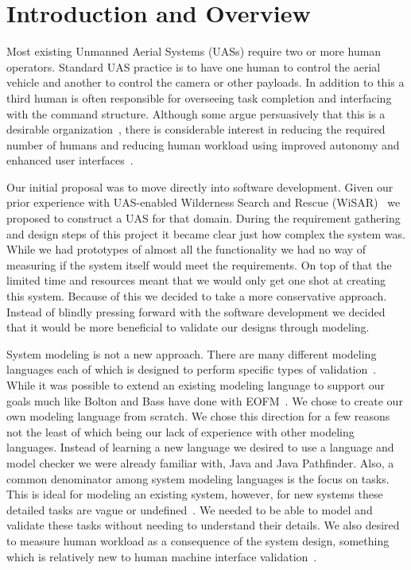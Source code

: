 \chapter{Introduction and Overview}
Most existing Unmanned Aerial Systems (UASs) require two or more human operators\cite{GoodrichMorse2008,MurphyStoverPrattGriffin2006}. Standard UAS practice is to have one human to control the aerial vehicle and another to control the camera or other payloads. In addition to this a third human is often responsible for overseeing task completion and interfacing with the command structure. Although some argue persuasively that this is a desirable organization~\cite{MurphyBurke2010}, there is considerable interest in reducing the required number of humans and reducing human workload using improved autonomy and enhanced user interfaces~\cite{Cummings2007,MitchellCummings2005,Goodrich2010}.

Our initial proposal was to move directly into software development.  Given our prior experience with UAS-enabled Wilderness Search and Rescue (WiSAR)~\cite{Goodrich2010} we proposed to construct a UAS for that domain.  During the requirement gathering and design steps of this project it became clear just how complex the system was.  While we had prototypes of almost all the functionality we had no way of measuring if the system itself would meet the requirements.  On top of that the limited time and resources meant that we would only get one shot at creating this system.  Because of this we decided to take a more conservative approach.  Instead of blindly pressing forward with the software development we decided that it would be more beneficial to validate our designs through modeling.

System modeling is not a new approach.  There are many different modeling languages each of which is designed to perform specific types of validation~\cite{bolton2013litreview}.  While it was possible to extend an existing modeling language to support our goals much like Bolton and Bass have done with EOFM~\cite{}.  We chose to create our own modeling language from scratch.  We chose this direction for a few reasons not the least of which being our lack of experience with other modeling languages.  Instead of learning a new language we desired to use a language and model checker we were already familiar with, Java and Java Pathfinder.  Also, a common denominator among system modeling languages is the focus on tasks.  This is ideal for modeling an existing system, however, for new systems these detailed tasks are vague or undefined~\cite{find evidence to back this up}.  We needed to be able to model and validate these tasks without needing to understand their details.  We also desired to measure human workload as a consequence of the system design, something which is relatively new to human machine interface validation~\cite{bolton2013litreview}.

